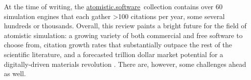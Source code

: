 \documentclass[9pt,review]{livecoms}
\newcommand{\atsoft}{\href{https://atomistic.software}{atomistic.software}\ }
\begin{document}

At the time of writing, the \atsoft collection contains over 60 simulation engines that each gather >100 citations per year, some several hundreds or thousands.
Overall, this review paints a bright future for the field of atomistic simulation: 
a growing variety of both commercial and free software to choose from, citation growth rates that substantially outpace the rest of the scientific literature, and a forecasted trillion dollar market potential for a digitally-driven materials revolution \cite{Satell2019}.
There are, however, some challenges ahead as well.
\end{document}
